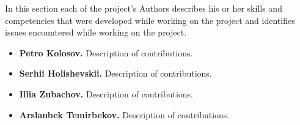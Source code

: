 In this section each of the project's Authors describes his or her skills and competencies that
were developed while working on the project and identifies issues encountered while working on the project.

\begin{itemize}
    \item \textbf{Petro Kolosov.} Description of contributions.
    \item \textbf{Serhii Holishevskii.} Description of contributions.
    \item \textbf{Illia Zubachov.} Description of contributions.
    \item \textbf{Arslanbek Temirbekov.} Description of contributions.
\end{itemize}